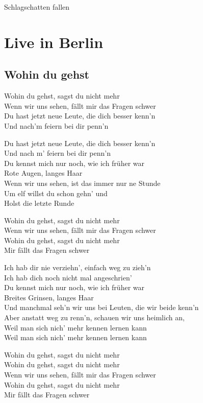 \documentclass[]{book}
\begin{document}
Schlagschatten fallen

\hypertarget{live-in-berlin}{%
\chapter{Live in Berlin}\label{live-in-berlin}}

\hypertarget{wohin-du-gehst-1}{%
\section{Wohin du gehst}\label{wohin-du-gehst-1}}

Wohin du gehst, sagst du nicht mehr\\
Wenn wir uns sehen, fällt mir das Fragen schwer\\
Du hast jetzt neue Leute, die dich besser kenn'n\\
Und nach'm feiern bei dir penn'n

Du hast jetzt neue Leute, die dich besser kenn'n\\
Und nach m' feiern bei dir penn'n\\
Du kennst mich nur noch, wie ich früher war\\
Rote Augen, langes Haar\\
Wenn wir uns sehen, ist das immer nur ne Stunde\\
Um elf willst du schon gehn' und\\
Holst die letzte Runde

Wohin du gehst, sagst du nicht mehr\\
Wenn wir uns sehen, fällt mir das Fragen schwer\\
Wohin du gehst, sagst du nicht mehr\\
Mir fällt das Fragen schwer

Ich hab dir nie verziehn', einfach weg zu zieh'n\\
Ich hab dich noch nicht mal angeschrien'\\
Du kennst mich nur noch, wie ich früher war\\
Breites Grinsen, langes Haar\\
Und manchmal seh'n wir uns bei Leuten, die wir beide kenn'n\\
Aber anstatt weg zu renn'n, schauen wir uns heimlich an,\\
Weil man sich nich' mehr kennen lernen kann\\
Weil man sich nich' mehr kennen lernen kann

Wohin du gehst, sagst du nicht mehr\\
Wohin du gehst, sagst du nicht mehr\\
Wenn wir uns sehen, fällt mir das Fragen schwer\\
Wohin du gehst, sagst du nicht mehr\\
Mir fällt das Fragen schwer
\end{document}
